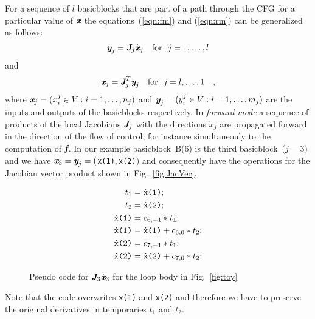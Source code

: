 \documentclass[11pt]{article}
\newcommand{\basicblock}{basicblock}
\newcommand{\bmf}{\mbox{\bf\em f}}
\newcommand{\bmJ}{\mbox{\bf\em J}}
\newcommand{\bmx}{\mbox{\bf\em x}}
\newcommand{\bmy}{\mbox{\bf\em y}}
\newcommand{\code}[1]{{\small\tt{#1}}}
\newcommand{\reffig}[1]{{Fig.~\ref{#1}}}
\begin{document}
For a sequence of $l$ {\basicblock}s that are part of 
a path through the CFG for a particular value of $\bmx$ the 
equations~(\ref{eqn:fm}) and (\ref{eqn:rm}) can be generalized as follows:
\begin{equation} \label{eqn:bbfm}
  \dot{\bmy}_j=\bmJ_j \dot{\bmx}_j \quad \text{for}~~j=1,\ldots,l
\end{equation} 
and 
\begin{equation} \label{eqn:bbrm}
  \bar{\bmx}_j=\bmJ^T_j \bar{\bmy}_j \quad \text{for}~~j=l,\ldots,1\quad ,
\end{equation} 
where $\bmx_j = (x^j_i \in V :  i=1,\ldots,n_j)$ and
$\bmy_j = (y^j_i \in V : i=1,\ldots,m_j)$ are the inputs and outputs of the 
{\basicblock}s
respectively. 
In {\em forward mode} a sequence of 
products of the local Jacobians $\bmJ_j$ 
with the directions $\dot{x}_j$ 
are propagated forward in the direction of the flow of control, for 
instance simultaneouly to the computation of $\bmf$.
In our example \basicblock\ B(6) is the third \basicblock\ ($j=3$) and we have
$\bmx_3=\bmy_j=($\code{x(1)}$,$\code{x(2)}$)$ and 
consequently have the operations for the Jacobian vector product shown 
in \reffig{fig:JacVec}.  
\begin{figure}[h]
  \begin{center}
    \begin{align*}
      t_1&=\dot{\tt x}\mbox{\tt (1)} ; \\
      t_2&=\dot{\tt x}\mbox{\tt (2)}; \\
      \dot{\tt x}\mbox{\tt (1)}&=c_{6,-1}*t_1; \\
      \dot{\tt x}\mbox{\tt (1)}&=\dot{\tt x}\mbox{\tt (1)}+c_{6,0}*t_2; \\
      \dot{\tt x}\mbox{\tt (2)}&=c_{7,-1}*t_1; \\
      \dot{\tt x}\mbox{\tt (2)}&=\dot{\tt x}\mbox{\tt (2)}+c_{7,0}*t_2; 
    \end{align*}
  \end{center}	
  \caption{Pseudo code for $\bmJ_3\dot{\bmx}_3$ for the loop body in \reffig{fig:toy}}\label{fig:toyPreacc}
\end{figure}
Note that the code overwrites \code{x(1)} and \code{x(2)} and therefore 
we have to preserve the original derivatives in temporaries $t_1$ and $t_2$.
\end{document}

